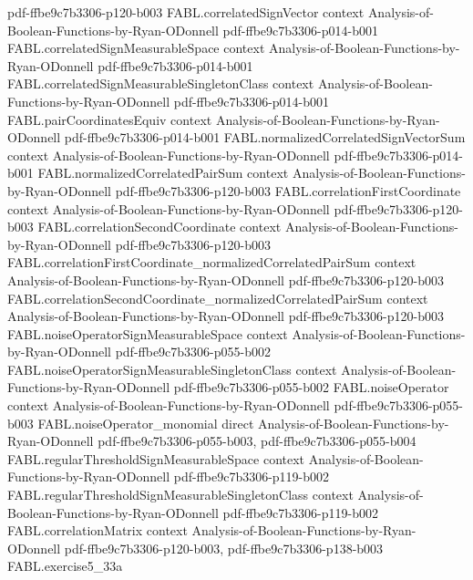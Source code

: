\begin{theorem}
  {pdf-ffbe9c7b3306-p120-b003}
\proofstep
  {FABL.correlatedSignVector}
  {context}
  {Analysis-of-Boolean-Functions-by-Ryan-ODonnell}
  {pdf-ffbe9c7b3306-p014-b001}
\proofstep
  {FABL.correlatedSignMeasurableSpace}
  {context}
  {Analysis-of-Boolean-Functions-by-Ryan-ODonnell}
  {pdf-ffbe9c7b3306-p014-b001}
\proofstep
  {FABL.correlatedSignMeasurableSingletonClass}
  {context}
  {Analysis-of-Boolean-Functions-by-Ryan-ODonnell}
  {pdf-ffbe9c7b3306-p014-b001}
\proofstep
  {FABL.pairCoordinatesEquiv}
  {context}
  {Analysis-of-Boolean-Functions-by-Ryan-ODonnell}
  {pdf-ffbe9c7b3306-p014-b001}
\proofstep
  {FABL.normalizedCorrelatedSignVectorSum}
  {context}
  {Analysis-of-Boolean-Functions-by-Ryan-ODonnell}
  {pdf-ffbe9c7b3306-p014-b001}
\proofstep
  {FABL.normalizedCorrelatedPairSum}
  {context}
  {Analysis-of-Boolean-Functions-by-Ryan-ODonnell}
  {pdf-ffbe9c7b3306-p120-b003}
\proofstep
  {FABL.correlationFirstCoordinate}
  {context}
  {Analysis-of-Boolean-Functions-by-Ryan-ODonnell}
  {pdf-ffbe9c7b3306-p120-b003}
\proofstep
  {FABL.correlationSecondCoordinate}
  {context}
  {Analysis-of-Boolean-Functions-by-Ryan-ODonnell}
  {pdf-ffbe9c7b3306-p120-b003}
\proofstep
  {FABL.correlationFirstCoordinate_normalizedCorrelatedPairSum}
  {context}
  {Analysis-of-Boolean-Functions-by-Ryan-ODonnell}
  {pdf-ffbe9c7b3306-p120-b003}
\proofstep
  {FABL.correlationSecondCoordinate_normalizedCorrelatedPairSum}
  {context}
  {Analysis-of-Boolean-Functions-by-Ryan-ODonnell}
  {pdf-ffbe9c7b3306-p120-b003}
\proofstep
  {FABL.noiseOperatorSignMeasurableSpace}
  {context}
  {Analysis-of-Boolean-Functions-by-Ryan-ODonnell}
  {pdf-ffbe9c7b3306-p055-b002}
\proofstep
  {FABL.noiseOperatorSignMeasurableSingletonClass}
  {context}
  {Analysis-of-Boolean-Functions-by-Ryan-ODonnell}
  {pdf-ffbe9c7b3306-p055-b002}
\proofstep
  {FABL.noiseOperator}
  {context}
  {Analysis-of-Boolean-Functions-by-Ryan-ODonnell}
  {pdf-ffbe9c7b3306-p055-b003}
\proofstep
  {FABL.noiseOperator_monomial}
  {direct}
  {Analysis-of-Boolean-Functions-by-Ryan-ODonnell}
  {pdf-ffbe9c7b3306-p055-b003,
    pdf-ffbe9c7b3306-p055-b004}
\proofstep
  {FABL.regularThresholdSignMeasurableSpace}
  {context}
  {Analysis-of-Boolean-Functions-by-Ryan-ODonnell}
  {pdf-ffbe9c7b3306-p119-b002}
\proofstep
  {FABL.regularThresholdSignMeasurableSingletonClass}
  {context}
  {Analysis-of-Boolean-Functions-by-Ryan-ODonnell}
  {pdf-ffbe9c7b3306-p119-b002}
\proofstep
  {FABL.correlationMatrix}
  {context}
  {Analysis-of-Boolean-Functions-by-Ryan-ODonnell}
  {pdf-ffbe9c7b3306-p120-b003,
    pdf-ffbe9c7b3306-p138-b003}
\proofstep
  {FABL.exercise5_33a}

\end{theorem}
